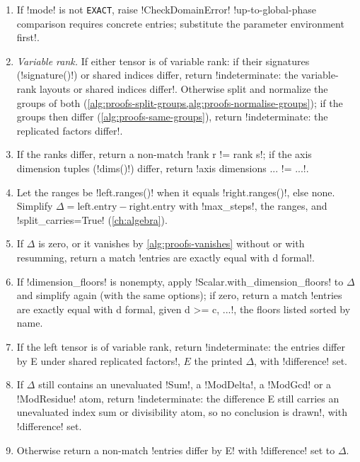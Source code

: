 \begin{algorithm}\label{alg:proofs-compare-symbolic}
\leavevmode
\begin{enumerate}
\item If \py!mode! is not \texttt{EXACT}, raise \py!CheckDomainError! \code!up-to-global-phase comparison requires concrete entries; substitute the parameter environment first!.
\item \emph{Variable rank.} If either tensor is of variable rank: if their signatures (\py!signature()!) or shared indices differ, return \code!indeterminate: the variable-rank layouts or shared indices differ!. Otherwise split and normalize the groups of both (\cref{alg:proofs-split-groups,alg:proofs-normalise-groups}); if the groups then differ (\cref{alg:proofs-same-groups}), return \code!indeterminate: the replicated factors differ!.
\item If the ranks differ, return a non-match \code!rank r != rank s!; if the axis dimension tuples (\py!dims()!) differ, return \code!axis dimensions ... != ...!.
\item Let the ranges be \py!left.ranges()! when it equals \py!right.ranges()!, else none. Simplify $\Delta=\text{left.entry}-\text{right.entry}$ with \py!max_steps!, the ranges, and \py!split_carries=True! (\cref{ch:algebra}).
\item If $\Delta$ is zero, or it vanishes by \cref{alg:proofs-vanishes} without or with resumming, return a match \code!entries are exactly equal with d formal!.
\item If \py!dimension_floors! is nonempty, apply \py!Scalar.with_dimension_floors! to $\Delta$ and simplify again (with the same options); if zero, return a match \code!entries are exactly equal with d formal, given d >= c, ...!, the floors listed sorted by name.
\item If the left tensor is of variable rank, return \code!indeterminate: the entries differ by E under shared replicated factors!, $E$ the printed $\Delta$, with \py!difference! set.
\item If $\Delta$ still contains an unevaluated \py!Sum!, a \py!ModDelta!, a \py!ModGcd! or a \py!ModResidue! atom, return \code!indeterminate: the difference E still carries an unevaluated index sum or divisibility atom, so no conclusion is drawn!, with \py!difference! set.
\item Otherwise return a non-match \code!entries differ by E! with \py!difference! set to $\Delta$.
\end{enumerate}
\end{algorithm}

